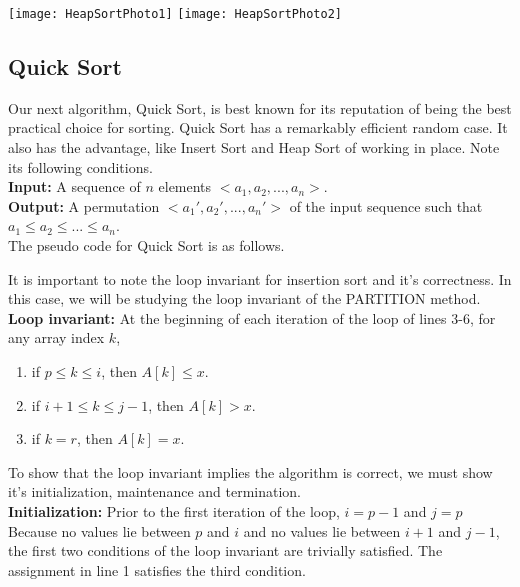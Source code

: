 \documentclass[12pt]{article}
\begin{document}
\texttt{[image: HeapSortPhoto1]}
\texttt{[image: HeapSortPhoto2]}


\subsection*{Quick Sort}
Our next algorithm, Quick Sort, is best known for its reputation of being the best practical choice for sorting. Quick Sort has a remarkably efficient random case. It also has the advantage, like Insert Sort and Heap Sort of working in place. Note its following conditions.\\

\textbf{Input:} A sequence of $n$ elements $<a_1, a_2, ..., a_n>$.\\

\textbf{Output:} A permutation $<a_1', a_2', ..., a_n'>$ of the input sequence such that \\
\indent $a_1 \le a_2 \le ... \le a_n$.\\

The pseudo code for Quick Sort is as follows.



It is important to note the loop invariant for insertion sort and it's correctness. In this case, we will be studying the loop invariant of the PARTITION method. \\

\textbf{Loop invariant:} At the beginning of each iteration of the loop of lines 3-6, for any array index $k$, \\
\begin{enumerate}
	\item if $p \le k \le i$, then $A[k] \le x$.
	\item if $i+1 \le k \le j-1$, then $A[k] > x$.
	\item if $k  = r$, then $A[k]= x$.
\end{enumerate}

To show that the loop invariant implies the algorithm is correct, we must show it's initialization, maintenance and termination. \\

\textbf{Initialization:} Prior to the first iteration of the loop, $i = p-1$ and $j = p $ Because no values lie between $p$ and $i$ and no values lie between $i+1$ and $j-1$, the first two conditions of the loop invariant are trivially satisfied. The assignment in line 1 satisfies the third condition.\\
\end{document}
